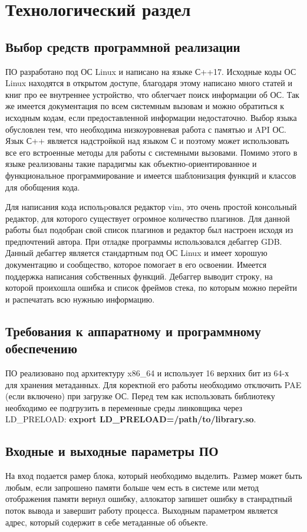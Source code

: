 \chapter{Технологический раздел}
\section{Выбор средств программной реализации}
ПО разработано под ОС Linux и написано на языке С++17. Исходные коды ОС Linux находятся в открытом доступе, благодаря этому написано много статей и книг про ее внутреннее устройство, что облегчает поиск информации об ОС. Так же имеется документация по всем системным вызовам и можно обратиться к исходным кодам, если предоставленной информации недостаточно. Выбор языка обусловлен тем, что необходима низкоуровневая работа с памятью и API ОС. Язык С++ является надстройкой над языком С и поэтому может использовать все его встроенные методы для работы с системными вызовами. Помимо этого в языке реализованы такие парадигмы как объектно-ориентированное и функциональное программирование и имеется шаблонизация функций и классов для обобщения кода.

Для написания кода испольpовался редактор vim, это очень простой консольный редактор, для которого существует огромное количество плагинов. Для данной работы был подобран свой список плагинов и редактор был настроен исходя из предпочтений автора. При отладке программы использовался дебаггер GDB. Данный дебаггер является стандартным под ОС Linux и имеет хорошую документацию и сообщество, которое помогает в его освоении. Имеется поддержка написания собственных функций. Дебаггер выводит строку, на которой проихошла ошибка и список фреймов стека, по которым можно перейти и распечатать всю нужныю информацию.

\section{Требования к аппаратному и программному обеспечению}
ПО реализовано под архитектуру x86\_64 и использует 16 верхних бит из 64-х для хранения метаданных. Для коректной его работы необходимо отключить PAE (если включено) при загрузке ОС. Перед тем как использовать библиотеку необходимо ее подгрузить в переменные среды линковщика через LD\_PRELOAD: \textbf{export LD\_PRELOAD=/path/to/library.so}.

\section{Входные и выходные параметры ПО}
На вход подается рамер блока, который необходимо выделить. Размер может быть любым, если запрошено памяти больше чем есть в системе или метод отображения памяти вернул ошибку, аллокатор запишет ошибку в станрадтный поток вывода и завершит работу процесса. Выходным параметром является адрес, который содержит в себе метаданные об объекте.

